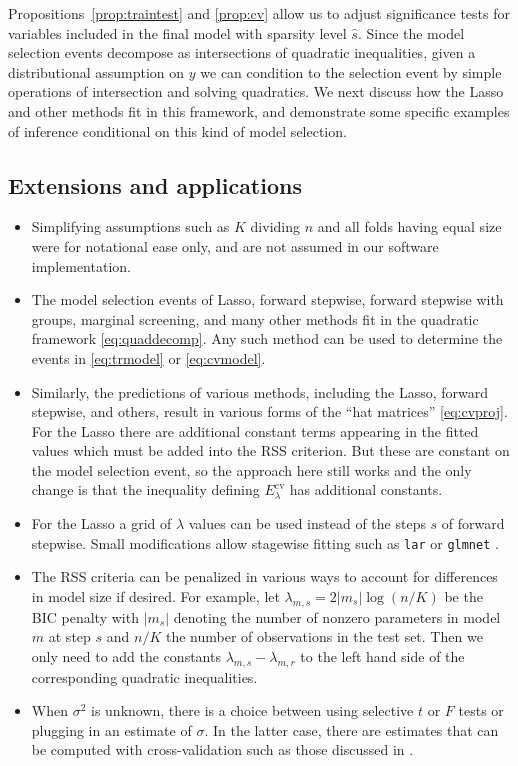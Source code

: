 \documentclass[preprint]{imsart}
\newcommand{\cv}{\text{cv}}
\begin{document}
Propositions~\ref{prop:traintest} and \ref{prop:cv} allow us to adjust
significance tests for variables included in the final model with
sparsity level $\hat s$. Since the model selection events decompose as
intersections of quadratic inequalities, given a distributional
assumption on $y$ we can condition to the selection event by simple
operations of intersection and solving quadratics. We next discuss how
the Lasso and other methods fit in this framework, and demonstrate some
specific examples of inference conditional on this kind of model
selection.

\subsection{Extensions and applications}

\begin{itemize}
\item Simplifying assumptions such as $K$ dividing $n$ and all folds
  having equal size were for notational ease only, and are not assumed
  in our software implementation.
\item The model selection events of Lasso, forward stepwise, forward
  stepwise with groups, marginal screening, and many other methods fit
  in the quadratic framework \eqref{eq:quaddecomp}.
  Any such method can be used to determine
  the events in \eqref{eq:trmodel} or \eqref{eq:cvmodel}.
\item Similarly, the predictions of various methods, including the
  Lasso, forward stepwise, and others, result in
  various forms of the ``hat matrices'' \eqref{eq:cvproj}. For the
  Lasso there are additional constant terms appearing in the fitted
  values which must be added into the RSS criterion. But these are
  constant on the model selection event, so the approach here still
  works and the only change is that the inequality defining
  $E^\cv_\lambda$ has additional constants.
\item For the Lasso a grid of $\lambda$ values
  can be used instead of the steps $s$ of forward stepwise. Small
  modifications allow stagewise fitting such as \texttt{lar}
  \citep{efron2004lar} or \texttt{glmnet} \citep{glmnet}.
\item The RSS criteria can be penalized in various
  ways to account for differences in model size if desired. For
  example, let $\lambda_{m,s} = 2|m_s|\log(n/K)$ be the BIC penalty
  with $|m_s|$ denoting the number of nonzero parameters in model $m$
  at step $s$ and $n/K$ the number of observations in the test
  set. Then we only need to add the constants $\lambda_{m,s} -
  \lambda_{m,r}$ to the left hand side of the corresponding quadratic
  inequalities. 
\item When $\sigma^2$ is unknown, there is a choice between using
  selective $t$ or $F$ tests or plugging in an estimate of $\sigma$.
  In the latter case, there are estimates that can be computed with
  cross-validation such as those discussed in \cite{reid2013sigma}.
\end{itemize}
\end{document}

